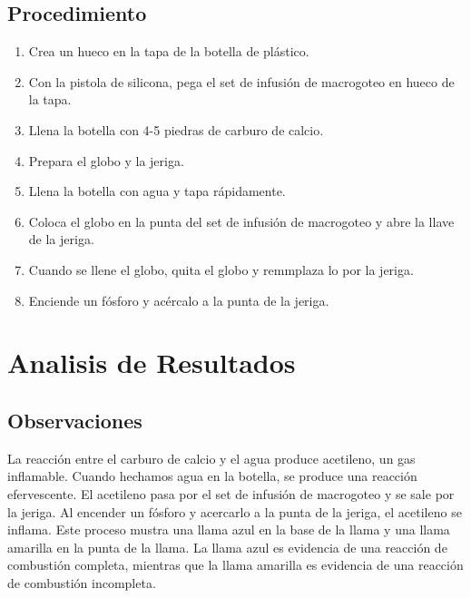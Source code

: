 \documentclass{article}
\begin{document}
\subsection{Procedimiento}
\begin{enumerate}
      \item Crea un hueco en la tapa de la botella de pl\'astico.
      \item Con la pistola de silicona, pega el set de infusión de macrogoteo en hueco de la tapa.
      \item Llena la botella con 4-5 piedras de carburo de calcio.
      \item Prepara el globo y la jeriga.
      \item Llena la botella con agua y tapa r\'apidamente.
      \item Coloca el globo en la punta del set de infusión de macrogoteo y abre la llave de la jeriga.
      \item Cuando se llene el globo, quita el globo y remmplaza lo por la jeriga.
      \item Enciende un f\'osforo y ac\'ercalo a la punta de la jeriga.
\end{enumerate}
\section*{Analisis de Resultados}
\subsection{Observaciones}
La reacci\'on entre el carburo de calcio y el agua produce acetileno, un gas inflamable. Cuando hechamos agua en la botella, se produce una reacci\'on efervescente. El acetileno pasa por el set de infusión de macrogoteo y se sale por la jeriga. Al encender un f\'osforo y acercarlo a la punta de la jeriga, el acetileno se inflama. Este proceso mustra una llama azul en la base de la llama y una llama amarilla en la punta de la llama. La llama azul es evidencia de una reacci\'on de combusti\'on completa, mientras que la llama amarilla es evidencia de una reacci\'on de combusti\'on incompleta.
\end{document}
